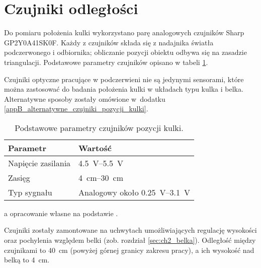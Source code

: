 \section{Czujniki odległości}
\label{sec:ch3_czujniki_odleglosci}

Do pomiaru położenia kulki wykorzystano parę analogowych czujników Sharp GP2Y0A41SK0F. Każdy z czujników składa się z nadajnika światła podczerwonego i odbiornika; obliczanie pozycji obiektu odbywa się na zasadzie triangulacji. Podstawowe parametry czujników opisano w tabeli \ref{tab:parametry_czujnikow_Sharp}.

Czujniki optyczne pracujące w podczerwieni nie są jedynymi sensorami, które można zastosować do badania położenia kulki w układach typu kulka i belka. Alternatywne sposoby zostały omówione w~dodatku \ref{appB_alternatywne_czujniki_pozycji_kulki}.

\begin{table}[h]
    \centering
    \begin{threeparttable}
        \caption{Podstawowe parametry czujników pozycji kulki.}
        \label{tab:parametry_czujnikow_Sharp}
        
        \begin{tabularx}{0.55\textwidth}{l | l}
            \toprule
            Parametr & Wartość \\
            \midrule
            Napięcie zasilania & \SIrange{4,5}{5,5}{\volt} \\
            Zasięg & \SIrange{4}{30}{\centi\meter} \\
            Typ sygnału & Analogowy około \SIrange{0,25}{3,1}{\volt} \\
            \bottomrule
        \end{tabularx}
        
        \begin{tablenotes}
            \footnotesize
            \item[a] opracowanie własne na podstawie \cite{SHARP_MANUAL}.
        \end{tablenotes}
    \end{threeparttable}
\end{table}

Czujniki zostały zamontowane na uchwytach umożliwiających regulację wysokości oraz pochylenia względem belki (zob. rozdział \ref{sec:ch2_belka}). Odległość między czujnikami to \SI{40}{\centi\meter} (powyżej górnej granicy zakresu pracy), a ich wysokość nad belką to \SI{4}{\centi\meter}.

